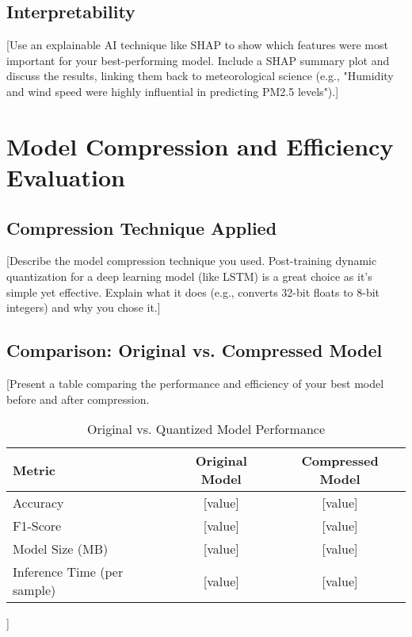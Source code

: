 \documentclass[11pt, a4paper]{article}
\begin{document}
\subsection{Interpretability}
[Use an explainable AI technique like SHAP to show which features were most important for your best-performing model. Include a SHAP summary plot and discuss the results, linking them back to meteorological science (e.g., "Humidity and wind speed were highly influential in predicting PM2.5 levels").]

\section{Model Compression and Efficiency Evaluation}

\subsection{Compression Technique Applied}
[Describe the model compression technique you used. Post-training dynamic quantization for a deep learning model (like LSTM) is a great choice as it's simple yet effective. Explain what it does (e.g., converts 32-bit floats to 8-bit integers) and why you chose it.]

\subsection{Comparison: Original vs. Compressed Model}
[Present a table comparing the performance and efficiency of your best model before and after compression.
\begin{table}[H]
    \caption{Original vs. Quantized Model Performance}
    \label{tab:compression-performance}
    \begin{adjustbox}{width=\textwidth,center}
        \begin{tabular}{l c c}
            \toprule
            \textbf{Metric} & \textbf{Original Model} & \textbf{Compressed Model} \\
            \midrule
            Accuracy & [value] & [value] \\
            F1-Score & [value] & [value] \\
            Model Size (MB) & [value] & [value] \\
            Inference Time (per sample) & [value] & [value] \\
            \bottomrule
        \end{tabular}
    \end{adjustbox}
\end{table}]
\end{document}
